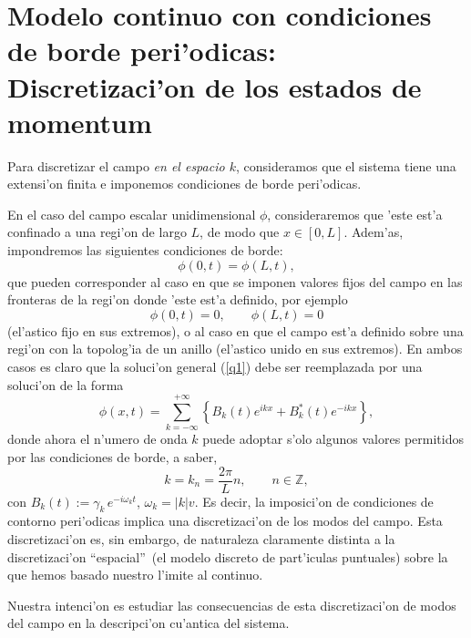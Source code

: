 \section{Modelo continuo con condiciones de borde peri'odicas: Discretizaci'on
de los estados de momentum}

Para discretizar el campo \textit{en el espacio $k$}, consideramos que el
sistema tiene una extensi'on finita e imponemos  condiciones de borde
peri'odicas.

En el caso del campo escalar unidimensional $\phi$, consideraremos que 'este
est'a confinado a una regi'on de largo $L$, de modo que $x\in [0,L]$. Adem'as,
impondremos las siguientes condiciones de borde:
\begin{equation}
\phi(0,t)=\phi(L,t),
\end{equation}
que pueden corresponder al caso en que se imponen valores fijos del campo en las
fronteras de la regi'on donde 'este est'a definido, por ejemplo
\begin{equation}
\phi(0,t)=0, \qquad \phi(L,t)=0
\end{equation}
(el'astico fijo en sus extremos), o al caso en que el campo est'a definido sobre
una regi'on con la topolog'ia de un anillo (el'astico unido en sus extremos). En
ambos casos es claro que la soluci'on general (\ref{q1}) debe ser reemplazada
por una soluci'on de la forma
\begin{equation}
\phi(x,t)=\sum_{k=-\infty}^{+\infty} \left\{B_k(t)
e^{ikx}+B_k^*(t)e^{-ikx}\right\},
\end{equation}
donde ahora el n'umero de onda $k$ puede adoptar s'olo algunos valores
permitidos
por las condiciones de borde, a saber,
\begin{equation}
k=k_n=\frac{2\pi}{L} n, \qquad n\in\mathbb{Z},
\end{equation}
con $B_k(t):=\gamma_k\, e^{-i\omega_kt}$, $\omega_k=|k|v$.  Es decir,
la imposici'on de condiciones de contorno peri'odicas implica una
discretizaci'on de los modos del campo. Esta discretizaci'on es, sin embargo, de naturaleza
claramente distinta a la discretizaci'on ``espacial''\, (el modelo discreto de
part'iculas puntuales) sobre la que hemos basado nuestro l'imite al continuo.

Nuestra intenci'on es estudiar las consecuencias de esta discretizaci'on de
modos del campo en la descripci'on cu'antica del sistema.

